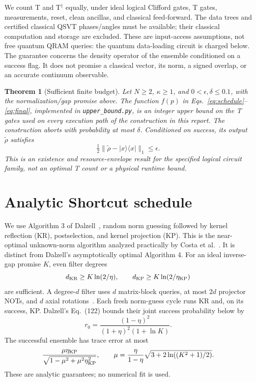 \documentclass[11pt]{article}
\newtheorem{theorem}{Theorem}
\newcommand{\ket}[1]{\lvert #1\rangle}
\newcommand{\bra}[1]{\langle #1\rvert}
\newcommand{\norm}[1]{\lVert #1\rVert}
\begin{document}
We count T and T$^\dagger$ equally, under ideal logical Clifford gates, T gates, measurements, reset, clean ancillas, and classical feed-forward. The data trees and certified classical QSVT phases/angles must be available; their classical computation and storage are excluded. These are input-access assumptions, not free quantum QRAM queries: the quantum data-loading circuit is charged below. The guarantee concerns the density operator of the ensemble conditioned on a success flag. It does not promise a classical vector, its norm, a signed overlap, or an accurate continuum observable.

\begin{theorem}[Sufficient finite budget]\label{thm:main}
Let $N\ge2$, $\kappa\ge1$, and $0<\epsilon,\delta\le0.1$, with the normalization/gap promise above. The function $f(p)$ in Eqs.~\eqref{eq:schedule}--\eqref{eq:final}, implemented in \texttt{upper\_bound.py}, is an integer upper bound on the T gates used on every execution path of the construction in this report. The construction aborts with probability at most $\delta$. Conditioned on success, its output $\widetilde\rho$ satisfies
\begin{equation}
 \tfrac12\norm{\widetilde\rho-\ket{x}\bra{x}}_1\le\epsilon.
\end{equation}
This is an existence and resource-envelope result for the specified logical circuit family, not an optimal T count or a physical runtime bound.
\end{theorem}

\section{Analytic Shortcut schedule}
We use Algorithm 3 of Dalzell~\cite{dalzell}, random norm guessing followed by kernel reflection (KR), postselection, and kernel projection (KP). This is the near-optimal unknown-norm algorithm analyzed practically by Costa et al.~\cite{costa}. It is distinct from Dalzell's asymptotically optimal Algorithm 4. For an ideal inverse-gap promise $K$, even filter degrees
\begin{equation}
 d_{\rm KR}\ge K\ln(2/\eta),\qquad d_{\rm KP}\ge K\ln(2/\eta_{\rm KP})
\end{equation}
are sufficient. A degree-$d$ filter uses $d$ matrix-block queries, at most $2d$ projector NOTs, and $d$ axial rotations~\cite{dalzell}. Each fresh norm-guess cycle runs KR and, on its success, KP. Dalzell's Eq.~(122) bounds their joint success probability below by
\begin{equation}\label{eq:rsource}
 r_0=\frac{(1-\eta)^2}{(1+\eta)^2(1+\ln K)}.
\end{equation}
The successful ensemble has trace error at most
\begin{equation}\label{eq:idealerror}
 \frac{\mu\eta_{\rm KP}}{\sqrt{1-\mu^2+\mu^2\eta_{\rm KP}^2}},\qquad
 \mu=\frac{\eta}{1-\eta}\sqrt{3+2\ln((K^2+1)/2)}.
\end{equation}
These are analytic guarantees; no numerical fit is used.
\end{document}
